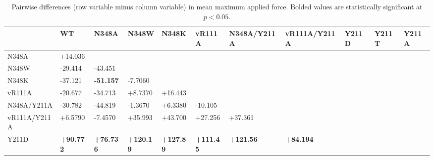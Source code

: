 \documentclass[12pt]{article}
\begin{document}
\clearpage
\begin {table}[H]
\caption{\label{tab:MAF_pairwise}Pairwise differences (row variable minus column variable) in mean maximum applied force. Bolded values are statistically significant at $p<0.05$.}
\begin{center}
  \resizebox{16cm}{!} {
    \begin{tabular}{l l l l l l l l l l l}
    \hline
             & WT                      & N348A                   & N348W                   & N348K                   & vR111A                  & N348A/Y211A               & vR111A/Y211A            & Y211D                   & Y211T                   & Y211A  \\ \hline
    N348A       & +14.036              &                         &                         &                         &                         &                           &                         &                         &                         &        \\
    N348W       & -29.414              & -43.451                 &                         &                         &                         &                           &                         &                         &                         &        \\
    N348K       & -37.121              & \textbf{-51.157}        & -7.7060                 &                         &                         &                           &                         &                         &                         &        \\
   vR111A       & -20.677              & -34.713                 & +8.7370                 & +16.443                 &                         &                           &                         &                         &                         &        \\
    N348A/Y211A & -30.782              & -44.819                 & -1.3670                 & +6.3380                 & -10.105                 &                           &                         &                         &                         &        \\
   vR111A/Y211A & +6.5790              & -7.4570                 & +35.993                 & +43.700                 & +27.256                 & +37.361                   &                         &                         &                         &        \\
    Y211D       & \textbf{+90.772}     & \textbf{+76.736}        & \textbf{+120.19}        & \textbf{+127.89}        & \textbf{+111.45}        & \textbf{+121.56}          & \textbf{+84.194}        &                         &                         &        \\

\end{tabular}}
\end{center}
\end{table}
\end{document}
